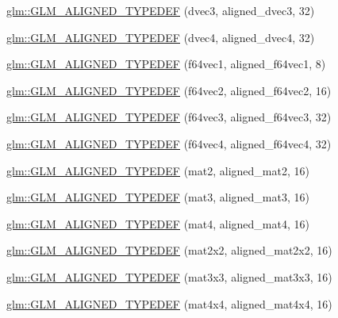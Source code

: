 \begin{DoxyCompactItemize}
\item 
\hyperlink{group__gtx__type__aligned_ga01fe6fee6db5df580b6724a7e681f069}{glm\-::\-G\-L\-M\-\_\-\-A\-L\-I\-G\-N\-E\-D\-\_\-\-T\-Y\-P\-E\-D\-E\-F} (dvec3, aligned\-\_\-dvec3, 32)
\item 
\hyperlink{group__gtx__type__aligned_ga687d5b8f551d5af32425c0b2fba15e99}{glm\-::\-G\-L\-M\-\_\-\-A\-L\-I\-G\-N\-E\-D\-\_\-\-T\-Y\-P\-E\-D\-E\-F} (dvec4, aligned\-\_\-dvec4, 32)
\item 
\hyperlink{group__gtx__type__aligned_ga8e842371d46842ff8f1813419ba49d0f}{glm\-::\-G\-L\-M\-\_\-\-A\-L\-I\-G\-N\-E\-D\-\_\-\-T\-Y\-P\-E\-D\-E\-F} (f64vec1, aligned\-\_\-f64vec1, 8)
\item 
\hyperlink{group__gtx__type__aligned_ga32814aa0f19316b43134fc25f2aad2b9}{glm\-::\-G\-L\-M\-\_\-\-A\-L\-I\-G\-N\-E\-D\-\_\-\-T\-Y\-P\-E\-D\-E\-F} (f64vec2, aligned\-\_\-f64vec2, 16)
\item 
\hyperlink{group__gtx__type__aligned_gaf3d3bbc1e93909b689123b085e177a14}{glm\-::\-G\-L\-M\-\_\-\-A\-L\-I\-G\-N\-E\-D\-\_\-\-T\-Y\-P\-E\-D\-E\-F} (f64vec3, aligned\-\_\-f64vec3, 32)
\item 
\hyperlink{group__gtx__type__aligned_ga804c654cead1139bd250f90f9bb01fad}{glm\-::\-G\-L\-M\-\_\-\-A\-L\-I\-G\-N\-E\-D\-\_\-\-T\-Y\-P\-E\-D\-E\-F} (f64vec4, aligned\-\_\-f64vec4, 32)
\item 
\hyperlink{group__gtx__type__aligned_gafed7d010235a3aa7ea2f88646858f2ae}{glm\-::\-G\-L\-M\-\_\-\-A\-L\-I\-G\-N\-E\-D\-\_\-\-T\-Y\-P\-E\-D\-E\-F} (mat2, aligned\-\_\-mat2, 16)
\item 
\hyperlink{group__gtx__type__aligned_ga17f911ee7b78ca6d1b91c4ab51ddb73c}{glm\-::\-G\-L\-M\-\_\-\-A\-L\-I\-G\-N\-E\-D\-\_\-\-T\-Y\-P\-E\-D\-E\-F} (mat3, aligned\-\_\-mat3, 16)
\item 
\hyperlink{group__gtx__type__aligned_ga31940e6012b72110e26fdb0f54805033}{glm\-::\-G\-L\-M\-\_\-\-A\-L\-I\-G\-N\-E\-D\-\_\-\-T\-Y\-P\-E\-D\-E\-F} (mat4, aligned\-\_\-mat4, 16)
\item 
\hyperlink{group__gtx__type__aligned_ga01de96cd0b541c52d2b4a3faf65822e9}{glm\-::\-G\-L\-M\-\_\-\-A\-L\-I\-G\-N\-E\-D\-\_\-\-T\-Y\-P\-E\-D\-E\-F} (mat2x2, aligned\-\_\-mat2x2, 16)
\item 
\hyperlink{group__gtx__type__aligned_gac88a191b004bd341e64fc53b5a4d00e3}{glm\-::\-G\-L\-M\-\_\-\-A\-L\-I\-G\-N\-E\-D\-\_\-\-T\-Y\-P\-E\-D\-E\-F} (mat3x3, aligned\-\_\-mat3x3, 16)
\item 
\hyperlink{group__gtx__type__aligned_gabe8c745fa2ced44a600a6e3f19991161}{glm\-::\-G\-L\-M\-\_\-\-A\-L\-I\-G\-N\-E\-D\-\_\-\-T\-Y\-P\-E\-D\-E\-F} (mat4x4, aligned\-\_\-mat4x4, 16)

\end{DoxyCompactItemize}
